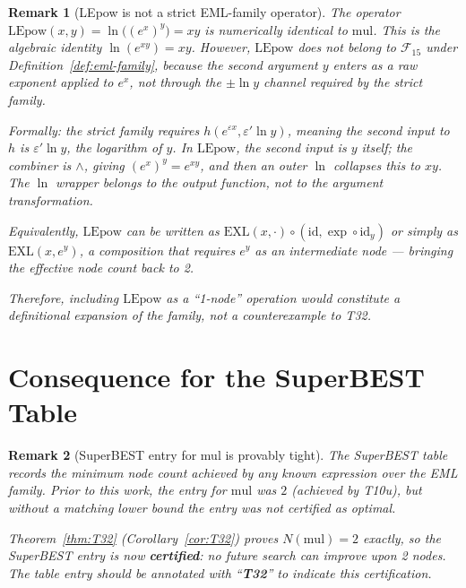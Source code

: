 \documentclass[11pt]{article}
\newtheorem{remark}{Remark}[section]
\begin{document}
\begin{remark}[LEpow is not a strict EML-family operator]
\label{rem:lepow}
The operator $\mathrm{LEpow}(x,y)=\ln\!\bigl((e^x)^y\bigr)=xy$ is numerically
identical to $\mathrm{mul}$.  This is the algebraic identity
$\ln(e^{xy})=xy$.  However, $\mathrm{LEpow}$ does \emph{not} belong to
$\mathcal{F}_{15}$ under Definition~\ref{def:eml-family}, because the second
argument $y$ enters as a \emph{raw exponent} applied to $e^x$, not through
the $\pm\ln y$ channel required by the strict family.

Formally: the strict family requires $h(e^{\varepsilon x},\varepsilon'\ln y)$, meaning
the second input to $h$ is $\varepsilon'\ln y$, the logarithm of $y$.
In $\mathrm{LEpow}$, the second input is $y$ itself; the combiner is $\wedge$,
giving $(e^x)^y = e^{xy}$, and then an outer $\ln$ collapses this to $xy$.
The $\ln$ wrapper belongs to the output function, not to the argument transformation.

Equivalently, $\mathrm{LEpow}$ can be written as
$\mathrm{EXL}(x,\cdot)\circ(\mathrm{id},\exp\circ\mathrm{id}_y)$
or simply as $\mathrm{EXL}(x,e^y)$, a composition that requires $e^y$ as an
intermediate node --- bringing the effective node count back to 2.

Therefore, including $\mathrm{LEpow}$ as a ``1-node'' operation would constitute
a definitional expansion of the family, not a counterexample to T32.
\end{remark}

\section{Consequence for the SuperBEST Table}

\begin{remark}[SuperBEST entry for mul is provably tight]
The SuperBEST table records the minimum node count achieved by any known
expression over the EML family.  Prior to this work, the entry for
$\mathrm{mul}$ was $2$ (achieved by T10u), but without a matching lower bound
the entry was not certified as optimal.

Theorem~\ref{thm:T32} (Corollary~\ref{cor:T32}) proves $N(\mathrm{mul})=2$
exactly, so the SuperBEST entry is now \textbf{certified}: no future search
can improve upon 2 nodes.  The table entry should be annotated with
``\textbf{T32}'' to indicate this certification.
\end{remark}
\end{document}
